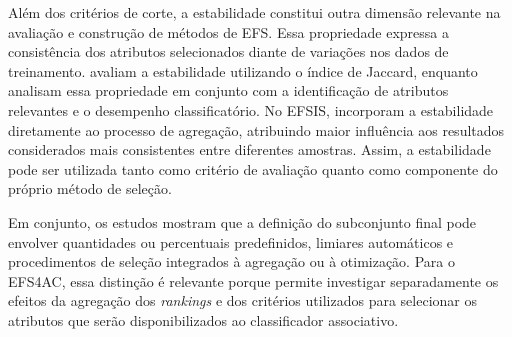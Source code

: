 Além dos critérios de corte, a estabilidade constitui outra dimensão relevante na avaliação e construção de métodos de EFS. Essa propriedade expressa a consistência dos atributos selecionados diante de variações nos dados de treinamento.  avaliam a estabilidade utilizando o índice de Jaccard, enquanto  analisam essa propriedade em conjunto com a identificação de atributos relevantes e o desempenho classificatório. No EFSIS,  incorporam a estabilidade diretamente ao processo de agregação, atribuindo maior influência aos resultados considerados mais consistentes entre diferentes amostras. Assim, a estabilidade pode ser utilizada tanto como critério de avaliação quanto como componente do próprio método de seleção.

Em conjunto, os estudos mostram que a definição do subconjunto final pode envolver quantidades ou percentuais predefinidos, limiares automáticos e procedimentos de seleção integrados à agregação ou à otimização. Para o EFS4AC, essa distinção é relevante porque permite investigar separadamente os efeitos da agregação dos \textit{rankings} e dos critérios utilizados para selecionar os atributos que serão disponibilizados ao classificador associativo.
